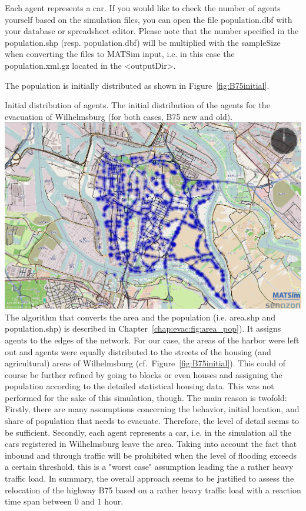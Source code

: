 Each agent represents a car. If you would like to check the number of agents yourself based on the simulation files, you can open the file population.dbf with your database or spreadsheet editor. Please note that the number specified in the population.shp (resp. population.dbf) will be multiplied with the sampleSize when converting the files to MATSim input, i.e. in this case the population.xml.gz located in the <outputDir>.

The population is initially distributed as shown in Figure~\ref{fig:B75initial}. 

\createfigure%
{Initial distribution of agents.}%
{The initial distribution of the agents for the evacuation of Wilhelmsburg (for both cases, B75 new and old).}%
{\label{fig:B75initial}}%
{\includegraphics[width=0.7\linewidth]{using/figures/B75initial}}%
{}
The algorithm that converts the area and the population (i.e. area.shp and population.shp) is described in Chapter~\ref{chap:evac:fig:area_pop}). It assigns agents to the edges of the network. For our case, the areas of the harbor were left out and agents were equally distributed to the streets of the housing (and agricultural) areas of Wilhelmsburg (cf.\ Figure~\ref{fig:B75initial}).
This could of course be further refined by going to blocks or even houses and assigning the population according to the detailed statistical housing data. This was not performed for the sake of this simulation, though. The main reason is twofold: Firstly, there are many assumptions concerning the behavior, initial location, and share of population that needs to evacuate. Therefore, the level of detail seems to be sufficient. Secondly, each agent represents a car, i.e. in the simulation all the cars registered in Wilhelmsburg leave the area. Taking into account the fact that inbound and through traffic will be prohibited when the level of flooding exceeds a certain threshold, this is a "worst case" assumption leading the a rather heavy traffic load. In summary, the overall approach seems to be justified to assess the relocation of the highway B75 based on a rather heavy traffic load with a reaction time span between 0 and 1 hour.


